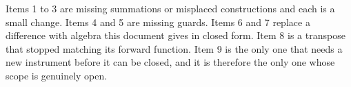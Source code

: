 \documentclass[11pt,a4paper]{article}
\begin{document}
Items 1 to 3 are missing summations or misplaced constructions and each is a small
change. Items 4 and 5 are missing guards. Items 6 and 7 replace a difference with
algebra this document gives in closed form. Item 8 is a transpose that stopped
matching its forward function. Item 9 is the only one that needs a new instrument
before it can be closed, and it is therefore the only one whose scope is genuinely
open.
\end{document}
